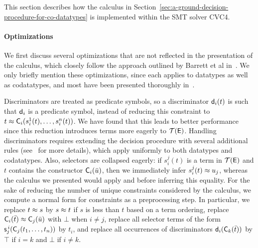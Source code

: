 This section describes how the calculus in Section~\ref{sec:a-ground-decision-procedure-for-co-datatypes} is implemented within the SMT solver CVC4.

\paragraph{Optimizations}
We first discuss several optimizations that are not reflected in the presentation of the calculus, which closely follow the approach outlined by Barrett et al in~\cite{}.
We only briefly mention these optimizations, since each applies to datatypes as well as codatatypes, and most have been presented thoroughly in~\cite{}.

Discriminators are treated as predicate symbols, so a discriminator $\textsf{d}_i( t )$ is such that $\textsf{d}_i$
is a predicate symbol, instead of reducing this constraint to $t \approx \textsf{C}_i( s^1_i( t ), \ldots, s^n_i( t ) )$.
We have found that this leads to better performance since this reduction introduces terms more eagerly to $\mathcal{T}(\mathsf{E})$.
Handling discriminators requires extending the decision procedure with several additional rules (see~\cite{} for more details), which apply uniformly to both datatypes and codatatypes.
Also, selectors are collapsed eagerly:
if $s^j_i( t )$ is a term in $\mathcal{T}(\mathsf{E})$ and $t$ contains the constructor
$\textsf{C}_i( \bar u )$, then we immediately infer $s^j_i( t ) \approx u_j$, whereas the calculus we presented would apply  and  before inferring this equality.
For the sake of reducing the number of unique constraints considered by the calculus, we compute a normal form for constraints as a preprocessing step.
In particular, we
replace $t \approx s$ by $s \approx t$ if $s$ is less than $t$ based on a term ordering,
replace $\textsf{C}_i( \bar t ) \approx \textsf{C}_j( \bar u )$ with $\bot$ when $i \neq j$,
replace all selector terms of the form $\textsf{s}^{\,i}_j( \textsf{C}_j(t_1,\ldots,t_n) )$ by $t_i$,
and replace all occurrences of discriminators $\textsf{d}_i( \textsf{C}_k( \bar t ) )$ by $\top$ if $i=k$ and $\bot$ if $i \neq k$.

